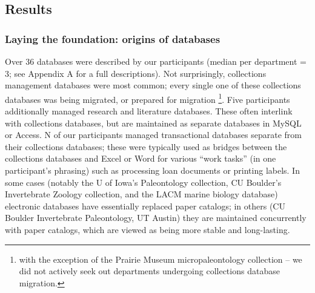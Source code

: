 \subsection{Results}
\subsubsection{Laying the foundation: origins of databases}

Over 36 databases were described by our participants (median per department = 3; see Appendix A for a full descriptions). Not surprisingly, collections management databases were most common; every single one of these collections databases was being migrated, or prepared for migration \footnote{with the exception of the Prairie Museum micropaleontology collection – we did not actively seek out departments undergoing collections database migration.}. Five participants additionally managed research and literature databases. These often interlink with collections databases, but are maintained as separate databases in MySQL or Access. N of our participants managed transactional databases separate from their collections databases; these were typically used as bridges between the collections databases and Excel or Word for various “work tasks” (in one participant’s phrasing) such as processing loan documents or printing labels. In some cases (notably the U of Iowa’s Paleontology collection, CU Boulder’s Invertebrate Zoology collection, and the LACM marine biology database) electronic databases have essentially replaced paper catalogs; in others (CU Boulder Invertebrate Paleontology, UT Austin) they are maintained concurrently with paper catalogs, which are viewed as being more stable and long-lasting.

